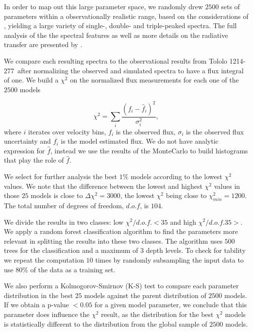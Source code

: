 \documentclass[a4,useAMS,usenatbib,usegraphicx]{mn2e}
\newcommand{\tol}{Tololo 1214-277}
\begin{document}
In order to map out this large parameter space, we randomly drew
$2500$ sets of parameters within a observationally realistic range,
based on the considerations of \citet{Laursen2013ApJ...766..124L}, 
yielding a large variety of single-, double- and triple-peaked
spectra. 
The full analysis of the the spectral features as well as
more details on the radiative transfer are presented by
\citet{Gronke2016}.    

We compare each resulting spectra to the observational results from
\tol\ after normalizing the observed and simulated spectra to have a 
flux integral of one.
We build a $\chi^2$ on the normalized flux measurements for each one
of the $2500$ models

\begin{equation}
\chi^2 = \sum_{i} \frac{({f}_i - \hat{f}_i)^2}{\sigma_i^2}, 
\label{eq:chi2}
\end{equation}
%
where $i$ iterates over velocity bins, $f_{i}$ is the observed flux,
$\sigma_i$ is the observed flux uncertainty and $\hat{f}_i$ is the
model estimated flux.
We do not have analytic expression for $\hat{f}$, instead we use the
results of the MonteCarlo to build histograms that play the role of
$\hat{f}$.   

We select for further analysis the best $1\%$ models according to the
lowest $\chi^2$ values.
We note that the difference between the lowest and highest $\chi^2$ values in
those $25$ models is close to $\Delta\chi^2 = 3000$, the lowest
$\chi^2$ being close to $\chi^2_{min}=1200$. 
The total number of degrees of freedom, $d.o.f$, is $104$. 

We divide the results in two classes: low $\chi^2/d.o.f.<35$ and high
$\chi^2/d.o.f.35>$.
We apply a random forest classification algorithm to find the
parameters more relevant in splitting the results into these two
classes. The algorithm uses $500$ trees for the classification and a
maximum of $3$ depth levels. 
To check for tability we repeat the computation $10$ times by
randomly subsampling the input data to use $80\%$ of the data as a
training set.

We also perform a Kolmogorov-Smirnov (K-S) test to compare each parameter
distribution in the best $25$ models against the parent distribution
of $2500$ models. 
If we obtain a p-value $<0.05$ for a given model parameter, we conclude that
this parameter does influence the $\chi^2$ result, as the distribution for
the best $\chi^2$ models is statistically different to the
distribution from the global sample of $2500$ models.  
\end{document}
